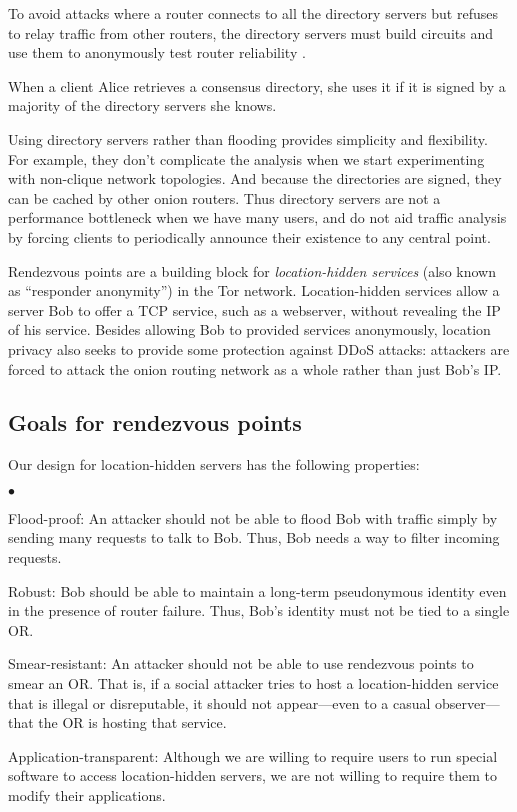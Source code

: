 \documentclass[times,10pt,twocolumn]{article}
\newenvironment{tightlist}{\begin{list}{$\bullet$}{
  \setlength{\itemsep}{0mm}
    \setlength{\parsep}{0mm}
    }}{\end{list}}
\begin{document}
To avoid attacks where a router connects to all the directory servers
but refuses to relay traffic from other routers, the directory servers
must build circuits and use them to anonymously test router reliability
\cite{mix-acc}.

When a client Alice retrieves a consensus directory, she uses it if it
is signed by a majority of the directory servers she knows.

Using directory servers rather than flooding provides simplicity and
flexibility. For example, they don't complicate the analysis when we
start experimenting with non-clique network topologies. And because
the directories are signed, they can be cached by other onion routers.
Thus directory servers are not a performance
bottleneck when we have many users, and do not aid traffic analysis by
forcing clients to periodically announce their existence to any
central point.


\label{sec:rendezvous}

Rendezvous points are a building block for \emph{location-hidden
services} (also known as ``responder anonymity'') in the Tor
network.  Location-hidden services allow a server Bob to offer a TCP
service, such as a webserver, without revealing the IP of his service.
Besides allowing Bob to provided services anonymously, location
privacy also seeks to provide some protection against DDoS attacks:
attackers are forced to attack the onion routing network as a whole
rather than just Bob's IP.

\subsection{Goals for rendezvous points}
\label{subsec:rendezvous-goals}
Our design for location-hidden servers has the following properties:
\begin{tightlist}
\item[Flood-proof:] An attacker should not be able to flood Bob with traffic
  simply by sending many requests to talk to Bob.  Thus, Bob needs a
  way to filter incoming requests.
\item[Robust:] Bob should be able to maintain a long-term pseudonymous
  identity even in the presence of router failure.  Thus, Bob's identity
  must not be tied to a single OR.
\item[Smear-resistant:] An attacker should not be able to use rendezvous
  points to smear an OR.  That is, if a social attacker tries to host a 
  location-hidden service that is illegal or disreputable, it should not
  appear---even to a casual observer---that the OR is hosting that service.
\item[Application-transparent:] Although we are willing to require users to
  run special software to access location-hidden servers, we are not willing
  to require them to modify their applications.
\end{tightlist}
\end{document}

